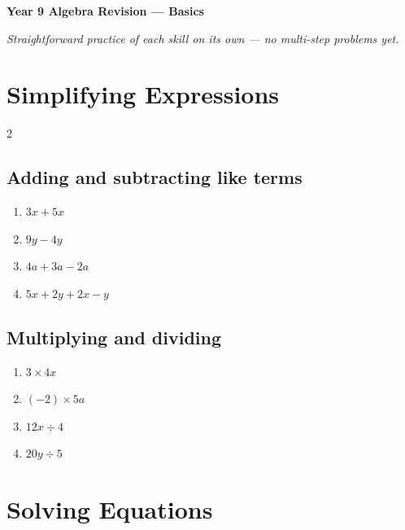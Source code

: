 \documentclass[11pt]{article}
\newcommand{\ans}{\hrulefill}
\begin{document}
\begin{center}
  {\Large\bfseries Year 9 Algebra Revision --- Basics}
\end{center}
\vspace{0.3em}
\noindent\textit{Straightforward practice of each skill on its own --- no multi-step problems yet.}

\vspace{0.4em}
\section{Simplifying Expressions}

\begin{multicols}{2}
\subsection*{Adding and subtracting like terms}
\begin{enumerate}
  \item $3x + 5x$ \ans
  \item $9y - 4y$ \ans
  \item $4a + 3a - 2a$ \ans
  \item $5x + 2y + 2x - y$ \ans
\end{enumerate}

\subsection*{Multiplying and dividing}
\begin{enumerate}[resume]
  \item $3 \times 4x$ \ans
  \item $(-2) \times 5a$ \ans
  \item $12x \div 4$ \ans
  \item $20y \div 5$ \ans
\end{enumerate}
\end{multicols}

\section{Solving Equations}
\end{document}
